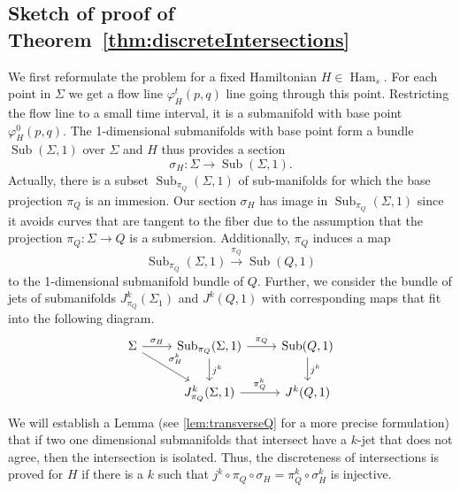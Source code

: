 \documentclass{amsart}
\newcommand{\Ham}{\operatorname{Ham}}
\newcommand{\sub}{\operatorname{Sub}}
\theoremstyle{definition}
\theoremstyle{remark}
\numberwithin{equation}{section}
\begin{document}
\subsection{Sketch of proof of Theorem~\ref{thm:discreteIntersections}}
We first reformulate the problem for a fixed Hamiltonian $H\in \Ham_s$. For each point in $\Sigma$ we get a flow line $\varphi^t_H(p,q)$ line going through this point. Restricting the flow line to a small time interval, it is a submanifold with base point $\varphi^0_H(p,q)$. The 1-dimensional submanifolds with base point form a bundle $\sub(\Sigma,1)$ over $\Sigma$ and $H$ thus provides a section
$$\sigma_H: \Sigma \longrightarrow \sub(\Sigma,1).$$
Actually, there is a subset  $\sub_{\pi_Q}(\Sigma,1)$ of sub-manifolds for which the base projection $\pi_Q$ is an immesion. Our section $\sigma_H$ has image in  $\sub_{\pi_Q}(\Sigma,1)$ since it avoids curves that are tangent to the fiber due to the assumption that the projection $\pi_Q\colon\Sigma\to Q$ is a submersion. Additionally, $\pi_Q$ induces a map 
$$\sub_{\pi_Q}(\Sigma,1)\stackrel{\pi_Q}\longrightarrow \sub(Q,1)$$
to the 1-dimensional submanifold bundle of $Q$. Further, we consider the bundle of jets of submanifolds $J^k_{\pi_Q}(\Sigma_1)$ and $J^k(Q,1)$ with corresponding maps that fit into the following diagram.
\[
  \begin{tikzcd}
    \Sigma \arrow{r}{\sigma_H} \arrow{dr}{\sigma_H^k}&  \sub_{\pi_Q}(\Sigma,1) \arrow{r}{\pi_Q} \arrow{d}{j^k} & \sub(Q,1) \arrow{d}{j^k} \\
         &  J^k_{\pi_Q}(\Sigma,1) \arrow{r}{\pi_Q^k} & J^k(Q,1)
  \end{tikzcd}
\]
We will establish a Lemma (see \ref{lem:transverseQ} for a more precise formulation) that if two one dimensional submanifolds that intersect have a $k$-jet that does not agree, then the intersection is isolated. Thus, the discreteness of intersections is proved for $H$ if there is a $k$ such that $j^k\circ \pi_Q\circ \sigma_H=\pi_Q^k\circ\sigma_H^k$ is injective.
\end{document}
